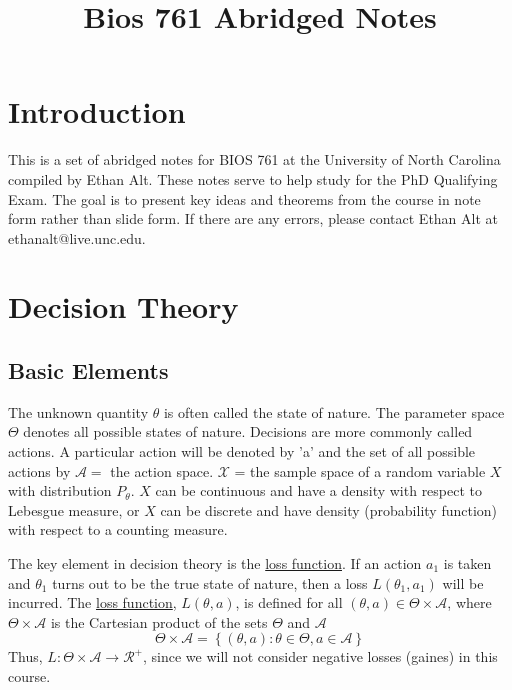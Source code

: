 \documentclass[12pt]{article}
\numberwithin{equation}{section}
\begin{document}
 

\title{Bios 761 Abridged Notes}
\date{}
\maketitle

\section{Introduction}
This is a set of abridged notes for BIOS 761 at the University of North Carolina compiled by Ethan Alt. These notes serve to help study for the PhD Qualifying Exam. The goal is to present key ideas and theorems from the course in note form rather than slide form. If there are any errors, please contact Ethan Alt at ethanalt@live.unc.edu.

\section{Decision Theory}
\subsection{Basic Elements}
The unknown quantity $\theta$ is often called the state of nature. The parameter space $\Theta$ denotes all possible states of nature.
Decisions are more commonly called actions. A particular action will be denoted by 'a' and the set of all possible actions by $\mathcal{A} =$ the action space. $\mathcal{X}$ = the sample space
of a random variable $X$ with distribution $P_{\theta}$. $X$ can be continuous and have a density with respect to Lebesgue measure, or $X$ can be discrete and have density (probability function) with respect to a counting measure.

The key element in decision theory is the \underline{loss function}. If an action $a_1$ is taken and $\theta_1$ turns out to be the true state of nature, then a loss $L(\theta_1, a_1)$ will be incurred. The \underline{loss function}, $L(\theta, a)$, is defined for all $(\theta, a) \in \Theta \times \mathcal{A}$, where $\Theta \times \mathcal{A}$ is the Cartesian product of the sets $\Theta$ and $\mathcal{A}$
\begin{equation*}
  \Theta \times \mathcal{A} = \left\{
  (\theta, a) : \theta \in \Theta, a \in \mathcal{A} 
  \right\}
\end{equation*}
%
Thus, $L : \Theta \times \mathcal{A} \to \mathcal{R}^+$, since we will not consider negative losses (gaines) in this course.
\end{document}
